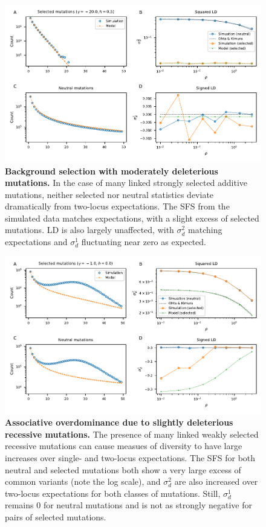 \documentclass[]{article}
\begin{document}
\begin{figure}[ht!]
    \centering
    \includegraphics{../figures/bgs_gamma_-20.0_h_0.5_n_50}
    \caption{
        \textbf{Background selection with moderately deleterious mutations.}
        In the case of many linked strongly selected additive mutations, neither
        selected nor neutral statistics deviate dramatically from two-locus expectations.
        The SFS from the simulated data matches expectations, with a slight excess
        of selected mutations. LD is also largely unaffected, with \(\sigma_d^2\)
        matching expectations and \(\sigma_d^1\) fluctuating near zero as expected.
    }
    \label{fig:bgs2}
\end{figure}

\begin{figure}[ht!]
    \centering
    \includegraphics{../figures/bgs_gamma_-1.0_h_0.0_n_50}
    \caption{
        \textbf{Associative overdominance due to slightly deleterious recessive mutations.}
        The presence of many linked weakly selected recessive mutations can cause
        measues of diversity to have large increases over single- and two-locus
        expectations. The SFS for both neutral and selected mutations both show
        a very large excess of common variants (note the log scale), and \(\sigma_d^2\)
        are also increased over two-locus expectations for both classes of mutations.
        Still, \(\sigma_d^1\) remains 0 for neutral mutations and is not as strongly
        negative for pairs of selected mutations.
    }
    \label{fig:bgs3}
\end{figure}
\end{document}
